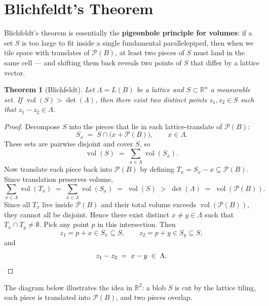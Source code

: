 \documentclass[11pt]{article}
\theoremstyle{plain}
\newtheorem{theorem}{Theorem}[section]
\theoremstyle{definition}
\newcommand{\R}{\mathbb{R}}
\newcommand{\vol}{\operatorname{vol}}
\begin{document}
\section{Blichfeldt's Theorem}

Blichfeldt's theorem is essentially the \textbf{pigeonhole principle for volumes}: if a set $S$ is too large to fit inside a single fundamental parallelepiped, then when we tile space with translates of $\mathcal{P}(B)$, at least two pieces of $S$ must land in the same cell — and shifting them back reveals two points of $S$ that differ by a lattice vector.

\begin{theorem}[Blichfeldt]
Let $\Lambda = L(B)$ be a lattice and $S \subset \R^n$ a measurable set. If $\vol(S) > \det(\Lambda)$,
then there exist two distinct points $z_1, z_2 \in S$ such that $z_1 - z_2 \in \Lambda$.
\end{theorem}

\begin{proof}
Decompose $S$ into the pieces that lie in each lattice-translate of $\mathcal{P}(B)$:
\[
  S_x \;=\; S \cap \bigl(x + \mathcal{P}(B)\bigr), \qquad x \in \Lambda.
\]
These sets are pairwise disjoint and cover $S$, so
\[
  \vol(S) \;=\; \sum_{x \in \Lambda} \vol(S_x).
\]
Now translate each piece back into $\mathcal{P}(B)$ by defining $T_x = S_x - x \subseteq \mathcal{P}(B)$. Since translation preserves volume,
\[
  \sum_{x \in \Lambda} \vol(T_x) \;=\; \sum_{x \in \Lambda} \vol(S_x) \;=\; \vol(S) \;>\; \det(\Lambda) \;=\; \vol(\mathcal{P}(B)).
\]
Since all $T_x$ live inside $\mathcal{P}(B)$ and their total volume exceeds $\vol(\mathcal{P}(B))$, they cannot all be disjoint. Hence there exist distinct $x \neq y \in \Lambda$ such that $T_x \cap T_y \neq \emptyset$. Pick any point $p$ in this intersection. Then
\[
  z_1 = p + x \in S_x \subseteq S, \qquad z_2 = p + y \in S_y \subseteq S,
\]
and
\[
  z_1 - z_2 \;=\; x - y \;\in\; \Lambda. \qedhere
\]
\end{proof}

\noindent The diagram below illustrates the idea in $\R^2$: a blob $S$ is cut by the lattice tiling, each piece is translated into $\mathcal{P}(B)$, and two pieces overlap.
\end{document}
